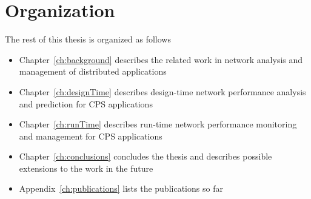 \section{Organization}
\label{sec:organization}
The rest of this thesis is organized as follows
\begin{itemize}
\item Chapter~\ref{ch:background} describes the related work in
  network analysis and management of distributed applications
\item Chapter~\ref{ch:designTime} describes design-time network
  performance analysis and prediction for CPS applications
\item Chapter~\ref{ch:runTime} describes run-time network performance
  monitoring and management for CPS applications
\item Chapter~\ref{ch:conclusions} concludes the thesis and describes
  possible extensions to the work in the future
\item Appendix~\ref{ch:publications} lists the publications so far
\end{itemize}







